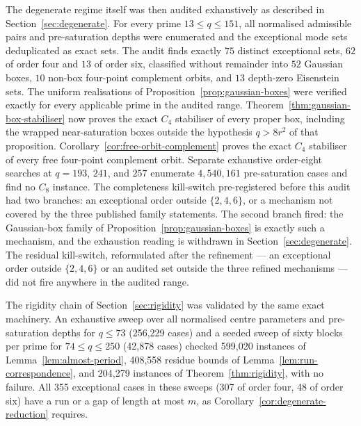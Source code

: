 \documentclass[11pt,a4paper]{article}
\theoremstyle{definition}
\theoremstyle{remark}
\begin{document}
The degenerate regime itself was then audited exhaustively as described in
Section~\ref{sec:degenerate}.
For every prime $13\leq q\leq151$, all normalised admissible pairs and pre-saturation
depths were enumerated and the exceptional mode sets deduplicated as exact sets.
The audit finds exactly $75$ distinct exceptional sets, $62$ of order four and $13$ of
order six, classified without remainder into $52$ Gaussian boxes, $10$ non-box four-point
complement orbits, and $13$ depth-zero Eisenstein sets.
The uniform realisations of Proposition~\ref{prop:gaussian-boxes} were verified exactly
for every applicable prime in the audited range.
Theorem~\ref{thm:gaussian-box-stabiliser} now proves the exact $C_4$ stabiliser of every
proper box, including the wrapped near-saturation boxes outside the hypothesis
$q>8r^2$ of that proposition.
Corollary~\ref{cor:free-orbit-complement} proves the exact $C_4$ stabiliser of every free
four-point complement orbit.
Separate exhaustive order-eight searches at $q=193$, $241$, and $257$ enumerate
$4{,}540{,}161$ pre-saturation cases and find no $C_8$ instance.
The completeness kill-switch pre-registered before this audit had two branches: an
exceptional order outside $\{2,4,6\}$, or a mechanism not covered by the three published
family statements.
The second branch fired: the Gaussian-box family of Proposition~\ref{prop:gaussian-boxes}
is exactly such a mechanism, and the exhaustion reading is withdrawn in
Section~\ref{sec:degenerate}.
The residual kill-switch, reformulated after the refinement --- an exceptional order
outside $\{2,4,6\}$ or an audited set outside the three refined mechanisms --- did not
fire anywhere in the audited range.

The rigidity chain of Section~\ref{sec:rigidity} was validated by the same exact machinery.
An exhaustive sweep over all normalised centre parameters and pre-saturation depths for
$q\leq73$ (256,229 cases) and a seeded sweep of sixty blocks per prime for
$74\leq q\leq250$ (42,878 cases) checked 599,020 instances of
Lemma~\ref{lem:almost-period}, 408,558 residue bounds of
Lemma~\ref{lem:run-correspondence}, and 204,279 instances of Theorem~\ref{thm:rigidity},
with no failure.
All 355 exceptional cases in these sweeps (307 of order four, 48 of order six) have a run
or a gap of length at most $m$, as Corollary~\ref{cor:degenerate-reduction} requires.
\end{document}
